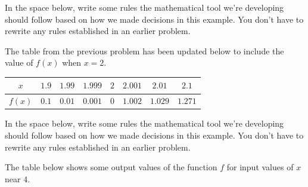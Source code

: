 \documentclass[10pt]{article}
\begin{document}
In the space below, write some rules the mathematical tool we're developing should follow based on how we made decisions in this example. You don't have to rewrite any rules established in an earlier problem.

\vfill

 The table from the previous problem has been updated below to include the value of $f(x)$ when $x=2$.

\begin{center}
\begin{tabular}{| c || c c c c c c c |}
\hline
 $x$  & $1.9$ & $1.99$ & $1.999$ & $2$ & $2.001$ & $2.01$ & $2.1$\\ 
 \hline
 $f(x)$ & $0.1$ & $0.01$  & $0.001$ & $0$ & $1.002$   & $1.029$  & $1.271$\\
 \hline
\end{tabular}
\end{center}


In the space below, write some rules the mathematical tool we're developing should follow based on how we made decisions in this example. You don't have to rewrite any rules established in an earlier problem.

\vfill

\newpage%

 The table below shows some output values of the function $f$ for input values of $x$ near $4$. 
\end{document}
